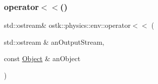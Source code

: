 \subsubsection{\texorpdfstring{operator$<$$<$()}{operator<<()}}
{\footnotesize\ttfamily std\+::ostream\& ostk\+::physics\+::env\+::operator$<$$<$ (\begin{DoxyParamCaption}\item[{std\+::ostream \&}]{an\+Output\+Stream,  }\item[{const \hyperlink{classostk_1_1physics_1_1env_1_1_object}{Object} \&}]{an\+Object }\end{DoxyParamCaption})}

